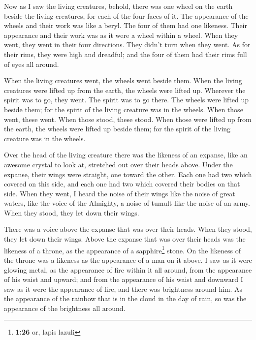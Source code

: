  Now as I saw the living creatures, behold, there was one
wheel on the earth beside the living creatures, for each of the four
faces of it.  The appearance of the wheels and their work
was like a beryl. The four of them had one likeness. Their appearance
and their work was as it were a wheel within a wheel. 
When they went, they went in their four directions. They didn't turn
when they went.  As for their rims, they were high and
dreadful; and the four of them had their rims full of eyes all around.

 When the living creatures went, the wheels went beside
them. When the living creatures were lifted up from the earth, the
wheels were lifted up.  Wherever the spirit was to go,
they went. The spirit was to go there. The wheels were lifted up beside
them; for the spirit of the living creature was in the wheels.
 When those went, these went. When those stood, these
stood. When those were lifted up from the earth, the wheels were lifted
up beside them; for the spirit of the living creature was in the wheels.

 Over the head of the living creature there was the
likeness of an expanse, like an awesome crystal to look at, stretched
out over their heads above.  Under the expanse, their
wings were straight, one toward the other. Each one had two which
covered on this side, and each one had two which covered their bodies on
that side.  When they went, I heard the noise of their
wings like the noise of great waters, like the voice of the Almighty, a
noise of tumult like the noise of an army. When they stood, they let
down their wings.

 There was a voice above the expanse that was over their
heads. When they stood, they let down their wings.  Above
the expanse that was over their heads was the likeness of a throne, as
the appearance of a sapphire\footnote{\textbf{1:26} or, lapis lazuli}
stone. On the likeness of the throne was a likeness as the appearance of
a man on it above.  I saw as it were glowing metal, as
the appearance of fire within it all around, from the appearance of his
waist and upward; and from the appearance of his waist and downward I
saw as it were the appearance of fire, and there was brightness around
him.  As the appearance of the rainbow that is in the
cloud in the day of rain, so was the appearance of the brightness all
around.

